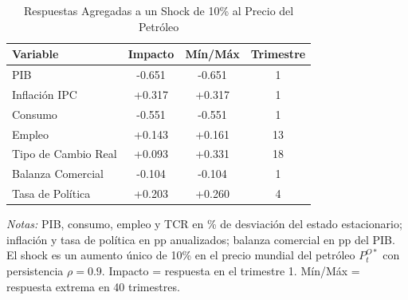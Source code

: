 \begin{table}[htbp]
\centering
\caption{Respuestas Agregadas a un Shock de 10\% al Precio del Petróleo}
\label{tab:oil_chiib0p05_agg}
\begin{threeparttable}
\begin{tabular}{@{}l c c c@{}}
\toprule
Variable & Impacto & Mín/Máx & Trimestre \\
\midrule
PIB & -0.651 & -0.651 & 1 \\
Inflación IPC & +0.317 & +0.317 & 1 \\
Consumo & -0.551 & -0.551 & 1 \\
Empleo & +0.143 & +0.161 & 13 \\
Tipo de Cambio Real & +0.093 & +0.331 & 18 \\
Balanza Comercial & -0.104 & -0.104 & 1 \\
Tasa de Política & +0.203 & +0.260 & 4 \\
\bottomrule
\end{tabular}
\begin{tablenotes}[flushleft]
\footnotesize
\item \textit{Notas:} PIB, consumo, empleo y TCR en \% de desviación del estado estacionario; inflación y tasa de política en pp anualizados; balanza comercial en pp del PIB. El shock es un aumento único de 10\% en el precio mundial del petróleo $P^{O*}_t$ con persistencia $\rho = 0.9$. Impacto = respuesta en el trimestre 1. Mín/Máx = respuesta extrema en 40 trimestres.
\end{tablenotes}
\end{threeparttable}
\end{table}
